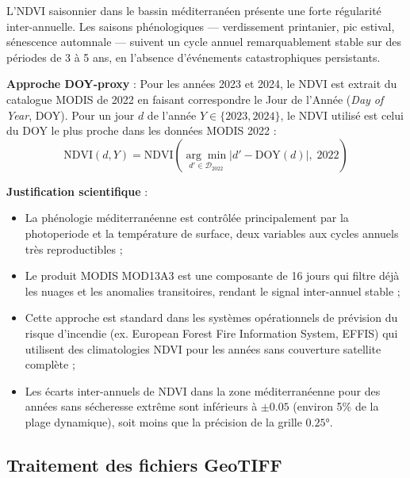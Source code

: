 \documentclass[12pt,a4paper]{report}
\begin{document}
\begin{firebox}[title=Pourquoi le même NDVI est utilisé pour 2022, 2023 et 2024]
L'NDVI saisonnier dans le bassin méditerranéen présente une forte régularité
inter-annuelle. Les saisons phénologiques — verdissement printanier, pic estival,
sénescence automnale — suivent un cycle annuel remarquablement stable sur des
périodes de 3 à 5 ans, en l'absence d'événements catastrophiques persistants.

\textbf{Approche DOY-proxy} : Pour les années 2023 et 2024, le NDVI est extrait du
catalogue MODIS de 2022 en faisant correspondre le Jour de l'Année (\emph{Day of Year},
DOY). Pour un jour $d$ de l'année $Y \in \{2023, 2024\}$, le NDVI utilisé est celui
du DOY le plus proche dans les données MODIS 2022 :
\begin{equation}
  \text{NDVI}(d, Y) = \text{NDVI}\!\left(\underset{d' \in \mathcal{D}_{2022}}{\arg\min}
  |d' - \text{DOY}(d)|,\; 2022\right)
\end{equation}

\textbf{Justification scientifique} :
\begin{itemize}[leftmargin=*,itemsep=2pt]
  \item La phénologie méditerranéenne est contrôlée principalement par la photoperiode
        et la température de surface, deux variables aux cycles annuels très reproductibles ;
  \item Le produit MODIS MOD13A3 est une composante de 16 jours qui filtre déjà les
        nuages et les anomalies transitoires, rendant le signal inter-annuel stable ;
  \item Cette approche est standard dans les systèmes opérationnels de prévision du
        risque d'incendie (ex. European Forest Fire Information System, EFFIS) qui
        utilisent des climatologies NDVI pour les années sans couverture satellite complète ;
  \item Les écarts inter-annuels de NDVI dans la zone méditerranéenne pour des années
        sans sécheresse extrême sont inférieurs à $\pm 0.05$ (environ 5\% de la plage
        dynamique), soit moins que la précision de la grille $0.25°$.
\end{itemize}
\end{firebox}

\subsection{Traitement des fichiers GeoTIFF}
\end{document}
